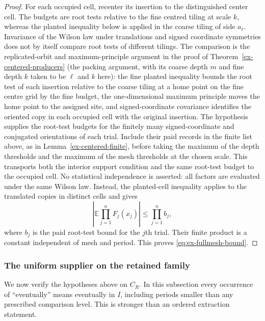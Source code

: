 \begin{proof}
For each occupied cell, recenter its insertion to the distinguished center
cell. The budgets are root tests relative to the fine centred tiling at
scale $k$, whereas the planted inequality below is applied in the coarse
tiling of side $a_\ell$. Invariance of the Wilson law under translations and
signed coordinate symmetries does not by itself compare root tests of
different tilings. The comparison is the replicated-orbit and
maximum-principle argument in the proof of
Theorem~\ref{ex-centered-producers} (the packing argument, with its coarse
depth $m$ and fine depth $k$ taken to be $\ell$ and $k$ here): the fine
planted inequality bounds the root test of each insertion relative to the
coarse tiling at a home point on the fine centre grid by the fine budget,
the one-dimensional maximum principle moves the home point to the assigned
site, and signed-coordinate covariance identifies the oriented copy in each
occupied cell with the original insertion. The hypothesis supplies the
root-test budgets for the finitely many signed-coordinate and conjugated
orientations of each trial. Include their paid records in the finite list
above, as in Lemma~\ref{ex-centered-finite}, before taking the maximum of the
depth thresholds and the maximum of the mesh thresholds at the chosen scale.
This transports both the
interior support condition and the same root-test budget to the occupied
cell. No statistical independence is asserted: all factors
are evaluated under the same Wilson law. Instead, the planted-cell
inequality applies to the translated copies in distinct cells and gives
\[
 \left|\mathbb E\prod_{j=1}^n F_j(x_j)\right|
       \leq \prod_{j=1}^n b_j,
\]
where $b_j$ is the paid root-test bound for the $j$th trial. Their finite
product is a constant independent of mesh and period. This proves
\eqref{eq:ex-fullmesh-bound}.
\end{proof}

\subsubsection{The uniform supplier on the retained family}

We now verify the hypotheses above on $C_R$. In this subsection every
occurrence of ``eventually'' means eventually in $I$, including periods
smaller than any prescribed comparison level. This is stronger than an
ordered extraction statement.

